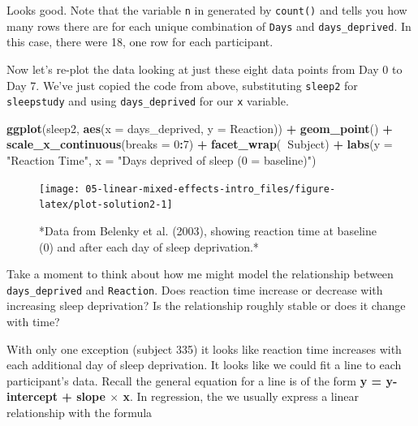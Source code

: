 \documentclass[]{book}
\newenvironment{Shaded}{\begin{snugshade}}{\end{snugshade}}
\newcommand{\DataTypeTok}[1]{\textcolor[rgb]{0.13,0.29,0.53}{#1}}
\newcommand{\DecValTok}[1]{\textcolor[rgb]{0.00,0.00,0.81}{#1}}
\newcommand{\KeywordTok}[1]{\textcolor[rgb]{0.13,0.29,0.53}{\textbf{#1}}}
\newcommand{\NormalTok}[1]{#1}
\newcommand{\OperatorTok}[1]{\textcolor[rgb]{0.81,0.36,0.00}{\textbf{#1}}}
\newcommand{\StringTok}[1]{\textcolor[rgb]{0.31,0.60,0.02}{#1}}
\begin{document}
Looks good. Note that the variable \texttt{n} in generated by \texttt{count()} and tells you how many rows there are for each unique combination of \texttt{Days} and \texttt{days\_deprived}. In this case, there were 18, one row for each participant.

Now let's re-plot the data looking at just these eight data points from Day 0 to Day 7. We've just copied the code from above, substituting \texttt{sleep2} for \texttt{sleepstudy} and using \texttt{days\_deprived} for our \texttt{x} variable.

\begin{Shaded}
\begin{Highlighting}[]
\KeywordTok{ggplot}\NormalTok{(sleep2, }\KeywordTok{aes}\NormalTok{(}\DataTypeTok{x =}\NormalTok{ days_deprived, }\DataTypeTok{y =}\NormalTok{ Reaction)) }\OperatorTok{+}
\StringTok{  }\KeywordTok{geom_point}\NormalTok{() }\OperatorTok{+}
\StringTok{  }\KeywordTok{scale_x_continuous}\NormalTok{(}\DataTypeTok{breaks =} \DecValTok{0}\OperatorTok{:}\DecValTok{7}\NormalTok{) }\OperatorTok{+}
\StringTok{  }\KeywordTok{facet_wrap}\NormalTok{(}\OperatorTok{~}\NormalTok{Subject) }\OperatorTok{+}
\StringTok{  }\KeywordTok{labs}\NormalTok{(}\DataTypeTok{y =} \StringTok{"Reaction Time"}\NormalTok{, }\DataTypeTok{x =} \StringTok{"Days deprived of sleep (0 = baseline)"}\NormalTok{)}
\end{Highlighting}
\end{Shaded}

\begin{figure}

{\centering \texttt{[image: 05-linear-mixed-effects-intro\_files/figure-latex/plot-solution2-1]} 

}

\caption{*Data from Belenky et al. (2003), showing reaction time at baseline (0) and after each day of sleep deprivation.*}\label{fig:plot-solution2}
\end{figure}

Take a moment to think about how me might model the relationship between \texttt{days\_deprived} and \texttt{Reaction}. Does reaction time increase or decrease with increasing sleep deprivation? Is the relationship roughly stable or does it change with time?

With only one exception (subject 335) it looks like reaction time increases with each additional day of sleep deprivation. It looks like we could fit a line to each participant's data. Recall the general equation for a line is of the form \textbf{y = y-intercept + slope \(\times\) x}. In regression, the we usually express a linear relationship with the formula
\end{document}
